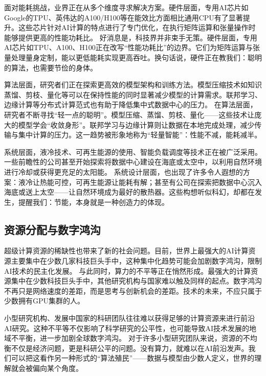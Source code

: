 面对能耗挑战，业界正在从多个维度寻求解决方案。硬件层面，专用AI芯片如Google的TPU、英伟达的A100/H100等在能效比方面相比通用CPU有了显著提升。这些芯片针对AI计算的特点进行了专门优化，在执行矩阵运算和张量操作时能够提供更高的性能功耗比。
好消息是，科技界并非束手无策。硬件层面，专用AI芯片如TPU、A100、H100正在改写“性能功耗比”的边界。它们为矩阵运算与张量处理量身定制，能以更低能耗实现更高吞吐。换句话说，硬件正在教我们：聪明的算法，也需要节俭的身体。

算法层面，研究者们正在探索更高效的模型架构和训练方法。模型压缩技术如知识蒸馏、剪枝、量化等可以在保持性能的同时显著减少模型的计算需求。联邦学习、边缘计算等分布式计算范式也有助于降低集中式数据中心的压力。
在算法层面，研究者不断寻找“轻一点的聪明”。模型压缩、蒸馏、剪枝、量化——这些技术让庞大的模型学会“收敛身形”。联邦学习与边缘计算则让数据在本地完成处理，减少传输与集中计算的压力。这一趋势被形象地称为“轻量智能”：性能不减，能耗减半。

系统层面，液冷技术、可再生能源的使用、智能负载调度等技术正在被广泛采用。一些前瞻性的公司甚至开始探索将数据中心建设在海底或太空中，以利用自然环境进行冷却或获得更充足的太阳能。
系统设计层面，也出现了许多令人遐想的方案：液冷让热能可控，可再生能源让能耗有解；甚至有公司在探索把数据中心沉入海底或送上太空——让自然环境成为最好的散热器。这些构想听似科幻，却都在发生，提醒我们：节能，本身就是一种创造力的体现。

\subsection{资源分配与数字鸿沟}

超级计算资源的稀缺性也带来了新的社会问题。目前，世界上最强大的AI计算资源主要集中在少数几家科技巨头手中，这种集中化趋势可能会加剧数字鸿沟，限制AI技术的民主化发展。
与此同时，算力的不平等正在悄然形成。最强大的计算资源集中在少数科技巨头手中，其他研究机构与国家难以触及同样的起点。数字鸿沟不再只是网络速度的差距，而是思考与创新机会的差距。技术的未来，不应只属于少数拥有GPU集群的人。

小型研究机构、发展中国家的科研团队往往难以获得足够的计算资源来进行前沿AI研究。这种不平等不仅影响了科学研究的公平性，也可能导致AI技术发展的地域不平衡，进一步加剧全球数字鸿沟。
对于许多小型研究团队来说，资源的不均衡不仅是经济问题，更是科研公平的问题。没有算力，就难以在AI前沿发声。我们可以把这看作另一种形式的“算法殖民”——数据与模型由少数人定义，世界的理解就会被偏向某个角度。

